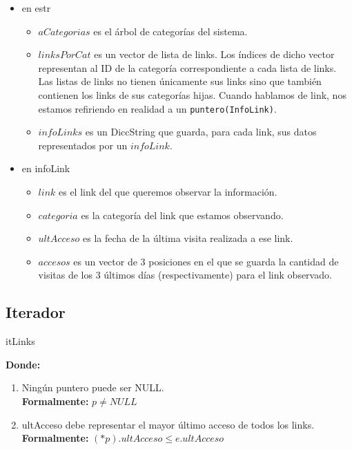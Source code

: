 \documentclass[10pt, a4paper]{article}
\let\TipoVariable=\texttt
\begin{document}
\begin{itemize}
  \item en estr
  \begin{itemize}
	\item $aCategorias$ es el \'arbol de categor\'ias del sistema.
	\item $linksPorCat$ es un vector de lista de links. Los \'indices de dicho vector representan al ID de la categor\'ia correspondiente a cada lista de links. Las listas de links no tienen \'unicamente sus links sino que tambi\'en contienen los links de sus categor\'ias hijas. Cuando hablamos de link, nos estamos refiriendo en realidad a un \TipoVariable{puntero(InfoLink)}. 
	\item $infoLinks$ es un DiccString que guarda, para cada link, sus datos representados por un $infoLink$.
  \end{itemize}
  \item en infoLink
  \begin{itemize}
	\item $link$ es el link del que queremos observar la informaci\'on.
	\item $categoria$ es la categor\'ia del link que estamos observando.
	\item $ultAcceso$ es la fecha de la \'ultima visita realizada a ese link.
	\item $accesos$ es un vector de 3 posiciones en el que se guarda la cantidad de visitas de los 3 \'ultimos d\'ias (respectivamente) para el link observado.
  \end{itemize}
\end{itemize}

\subsection{Iterador}

\begin{Estructura}{itLinks}
	\begin{Tupla}
	\end{Tupla}
\end{Estructura}

\mbox{}

{\bf Donde:}

\begin{enumerate}
  \item Ning\'un puntero puede ser NULL.\\
		{\bf Formalmente:} $p \neq NULL$

  \item ultAcceso debe representar el mayor \'ultimo acceso de todos los links.\\
		{\bf Formalmente:} $(*p).ultAcceso \leq e.ultAcceso$
\end{enumerate}
\end{document}
